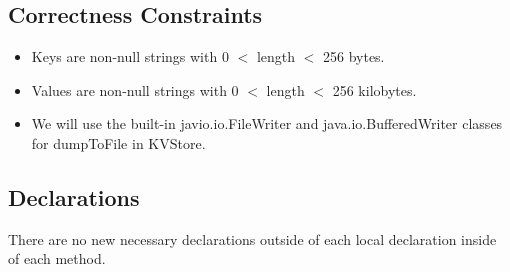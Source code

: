 \documentclass{article}
\begin{document}
\subsection*{Correctness Constraints}
\begin{itemize}
\item Keys are non-null strings with 0 $<$ length $<$ 256 bytes.
\item Values are non-null strings with 0 $<$ length $<$ 256 kilobytes.
\item We will use the built-in javio.io.FileWriter and java.io.BufferedWriter 
classes for dumpToFile in KVStore.

\end{itemize}

\subsection*{Declarations}
There are no new necessary declarations outside of each local declaration inside of each method.
\end{document}
